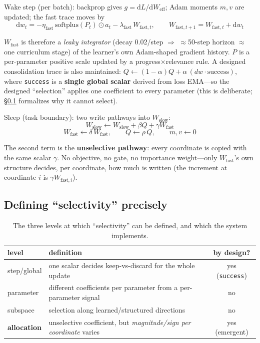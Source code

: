 \documentclass{article} %
\begin{document}
Wake step (per batch): backprop gives $g = \mathrm{d}L/\mathrm{d}W_{\mathrm{eff}}$; Adam moments $m,v$ are updated; the fast trace moves by
\begin{equation}
\mathrm{d}w_t = -\eta_{\mathrm{fast}}\,\mathrm{softplus}(P_t)\odot \hat{a}_t - \lambda_{\mathrm{fast}}\,W_{\mathrm{fast},t},\qquad W_{\mathrm{fast},t+1} = W_{\mathrm{fast},t} + \mathrm{d}w_t
\end{equation}

$W_{\mathrm{fast}}$ is therefore a \emph{leaky integrator} (decay 0.02/step $\Rightarrow$ $\approx$50-step horizon $\approx$ one curriculum stage) of the learner's own Adam-shaped gradient history. $P$ is a per-parameter positive scale updated by a progress$\times$relevance rule. A designed consolidation trace is also maintained: $Q \leftarrow (1-\alpha)Q + \alpha\,(dw\cdot\mathrm{success})$, where \texttt{success} is a \textbf{single global scalar} derived from loss EMA---so the designed ``selection'' applies one coefficient to every parameter (this is deliberate; \S\ref{sec:levels} formalizes why it cannot select).

Sleep (task boundary): two write pathways into $W_{\mathrm{slow}}$:
\begin{equation}
W_{\mathrm{slow}} \leftarrow W_{\mathrm{slow}} + \beta Q + \gamma W_{\mathrm{fast}}
\end{equation}
\begin{equation}
W_{\mathrm{fast}} \leftarrow \delta\,W_{\mathrm{fast}},\qquad Q \leftarrow \rho\,Q,\qquad m,v \leftarrow 0
\end{equation}

The second term is the \textbf{unselective pathway}: every coordinate is copied with the same scalar $\gamma$. No objective, no gate, no importance weight---only $W_{\mathrm{fast}}$'s own structure decides, per coordinate, how much is written (the increment at coordinate $i$ is $\gamma W_{\mathrm{fast},i}$).

\subsection{Defining ``selectivity'' precisely}
\label{sec:levels}

\begin{table}[h]
\centering
\small
\begin{tabular}{@{}p{}p{}c@{}}
\toprule
level & definition & by design? \\
\midrule
step/global & one scalar decides keep-vs-discard for the whole update & yes (\texttt{success}) \\
parameter & different coefficients per parameter from a per-parameter signal & no \\
subspace & selection along learned/structured directions & no \\
\textbf{allocation} & unselective coefficient, but \emph{magnitude/sign per coordinate} varies & yes (emergent) \\
\bottomrule
\end{tabular}
\caption{The three levels at which ``selectivity'' can be defined, and which the system implements.}
\label{tab:levels}
\end{table}
\end{document}
